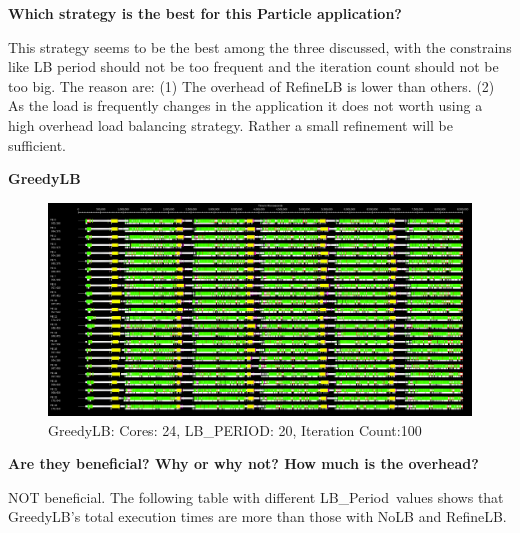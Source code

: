 \documentclass[10pt,times]{report}
\newcommand{\lbp}{LB\_Period}
\begin{document}
  \begin{flushleft}
    \textbf{\small{Which  strategy  is  the  best  for  this  Particle  application?}}
  \end{flushleft}
  This strategy seems to be the best among the three discussed, with the
  constrains like LB period should not be too frequent and the iteration count
  should not be too big. The reason are: (1) The overhead of RefineLB is lower
  than others.  (2) As the load is frequently changes in the application it
  does not worth using a high overhead load balancing strategy. Rather a small
  refinement will be sufficient.

\pagebreak
\begin{flushleft}
\textbf{\Large{GreedyLB}}
\end{flushleft}

  \begin{figure}[htbp]
    \begin{center}
       \includegraphics{TL_100_20_GLB_24.png} 
    \end{center}
    \caption{GreedyLB: Cores: 24, LB\_PERIOD: 20, Iteration Count:100}
      \label{fig:2} 
  \end{figure}

  \begin{flushleft}
    \textbf{Are   they   beneficial?   Why   or   why   not?   How   much   is   the   overhead?}  
  \end{flushleft}
  NOT beneficial. The following table with different \lbp\ values shows that GreedyLB's total execution times are  more than those with NoLB and RefineLB.
\end{document}
